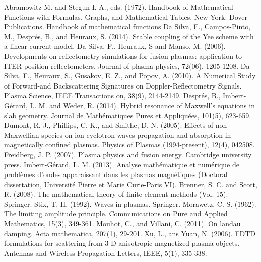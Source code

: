\documentclass[proc]{edpsmath}
\begin{document}
\begin{thebibliography}{99}
	 Abramowitz M. and Stegun I. A., eds. (1972). Handbook of Mathematical Functions with Formulas, Graphs, and Mathematical Tables. New York: Dover Publications.
	Handbook of mathematical functions
 Da Silva, F., Campos-Pinto, M., Després, B., and Heuraux, S. (2014). Stable coupling of the Yee scheme with a linear current model.
 Da Silva, F., Heuraux, S and  Manso, M. (2006). Developments on reflectometry simulations for fusion plasmas: application to ITER position reflectometers. Journal of plasma physics, 72(06), 1205-1208.
Da Silva, F., Heuraux, S., Gusakov, E. Z., and Popov, A. (2010). A Numerical Study of Forward-and Backscattering Signatures on Doppler-Reflectometry Signals. Plasma Science, IEEE Transactions on, 38(9), 2144-2149.
 Després, B., Imbert-Gérard, L. M. and Weder, R. (2014). Hybrid resonance of Maxwell's equations in slab geometry. Journal de Mathématiques Pures et Appliquées, 101(5), 623-659.
 Dumont, R. J., Phillips, C. K., and Smithe, D. N. (2005). Effects of non-Maxwellian species on ion cyclotron waves propagation and absorption in magnetically confined plasmas. Physics of Plasmas (1994-present), 12(4), 042508.
 Freidberg, J. P. (2007). Plasma physics and fusion energy. Cambridge university press.
 Imbert-Gérard, L. M. (2013). Analyse mathématique et numérique de problèmes d'ondes apparaissant dans les plasmas magnétiques (Doctoral dissertation, Université Pierre et Marie Curie-Paris VI).
 Brenner, S. C. and Scott, R. (2008). The mathematical theory of finite element methods (Vol. 15). Springer.
 Stix, T. H. (1992). Waves in plasmas. Springer.
 Morawetz, C. S. (1962). The limiting amplitude principle. Communications on Pure and Applied Mathematics, 15(3), 349-361.
 Mouhot, C., and Villani, C. (2011). On landau damping. Acta mathematica, 207(1), 29-201.
Xu, L., ans Yuan, N. (2006). FDTD formulations for scattering from 3-D anisotropic magnetized plasma objects. Antennas and Wireless Propagation Letters, IEEE, 5(1), 335-338.
\end{thebibliography}
\end{document}
